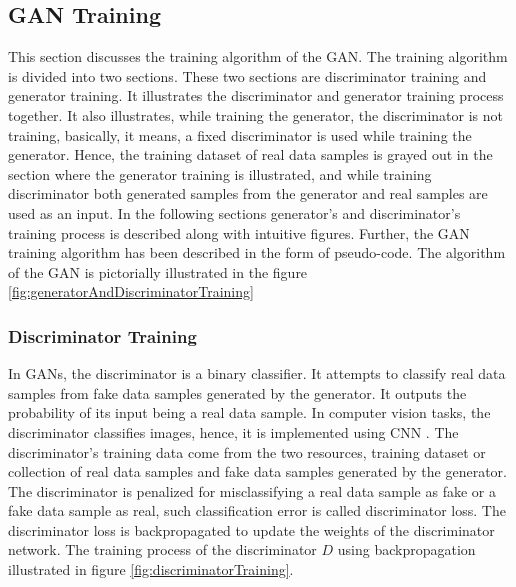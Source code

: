 \subsection{\ac{GAN} Training}


This section discusses the training algorithm of the \ac{GAN}. The training algorithm is divided into two sections. These two sections are discriminator training and generator training. It illustrates the discriminator and generator training process together. It also illustrates, while training the generator, the discriminator is not training, basically, it means, a fixed discriminator is used while training the generator. Hence, the training dataset of real data samples is grayed out in the section where the generator training is illustrated, and while training discriminator both generated samples from the generator and real samples are used as an input. In the following sections generator's and discriminator's training process is described along with intuitive figures. Further, the \ac{GAN} training algorithm has been described in the form of pseudo-code. The algorithm of the \ac{GAN} is pictorially illustrated in the figure \ref{fig:generatorAndDiscriminatorTraining}

\subsubsection{Discriminator Training}\label{TheDiscriminatorSubSection}

In \acp{GAN}, the discriminator is a binary classifier. It attempts to classify real data samples from fake data samples generated by the generator. It outputs the probability of its input being a real data sample. In computer vision tasks, the discriminator classifies images, hence, it is implemented using \ac{CNN} \cite{radford2016unsupervised}. The discriminator's training data come from the two resources, training dataset or collection of real data samples and fake data samples generated by the generator. The discriminator is penalized for misclassifying a real data sample as fake or a fake data sample as real, such classification error is called discriminator loss. The discriminator loss is backpropagated to update the weights of the discriminator network. The training process of the discriminator $D$ using backpropagation illustrated in figure \ref{fig:discriminatorTraining}.

